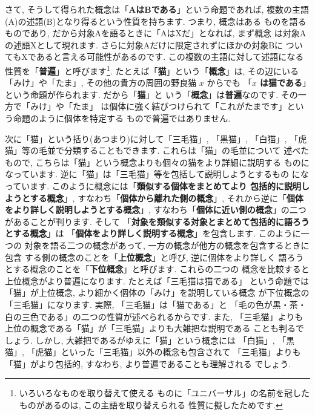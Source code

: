 さて, そうして得られた概念は「\textbf{AはBである}」という命題であれば,
 複数の主語(A)の述語(B)となり得るという性質を持ちます. つまり, 概念はある
ものを語るものであり, だから対象Aを語るときに「AはXだ」となれば, まず概念
は対象Aの述語Xとして現れます. さらに対象Aだけに限定されずにほかの対象Bに
ついてもXであると言える可能性があるのです. この複数の主語に対して述語になる
性質を「\textbf{普遍}」と呼びます\footnote{いろいろなものを取り替えて使える
ものに「ユニバーサル」の名前を冠したものがあるのは, この主語を取り替えられる
性質に擬したためです.}. たとえば「\textbf{猫}」という「\textbf{概念}」は,
 その辺にいる「みけ」や「たま」, その他の貴方の周囲の野良猫 $x$ からでも
「\textbf{$x$ は猫である}」という命題が作られます. だから「\textbf{猫}」と
いう「\textbf{概念}」は\textbf{普遍}なのです. その一方で「みけ」や「たま」
は個体に強く結びつけられて「これがたまです」という命題のように個体を特定する
もので普遍ではありません. 
\newline

次に「猫」という括り(あつまり)に対して「三毛猫」, 「黒猫」, 「白猫」,
 「虎猫」等の毛並で分類することもできます. これらは「猫」の毛並について
述べたもので, こちらは「猫」という概念よりも個々の猫をより詳細に説明する
ものになっています. 逆に「猫」は「三毛猫」等を包括して説明しようとするもの
になっています. このように概念には「\textbf{類似する個体をまとめてより
包括的に説明しようとする概念}」, すなわち「\textbf{個体から離れた側の概念}」,
 それから逆に「\textbf{個体をより詳しく説明しようとする概念}」, 
 すなわち「\textbf{個体に近い側の概念}」の二つがあることが判ります. そして
「\textbf{対象を類似する対象とまとめて包括的に語ろうとする概念}」は
「\textbf{個体をより詳しく説明する概念}」を包含します. このように一つの
対象を語る二つの概念があって, 一方の概念が他方の概念を包含するときに包含
する側の概念のことを「\textbf{上位概念}」と呼び, 逆に個体をより詳しく
語ろうとする概念のことを「\textbf{下位概念}」と呼びます. これらの二つの
概念を比較すると上位概念がより普遍になります. たとえば「三毛猫は猫である」
という命題では「猫」が上位概念, より細かく個体の「みけ」を説明している概念
が下位概念の「三毛猫」になります. 実際, 「三毛猫」は「猫である」と
「毛の色が黒・茶・白の三色である」の二つの性質が述べられるからです. また,
 「三毛猫」よりも上位の概念である「猫」が「三毛猫」よりも大雑把な説明である
ことも判るでしょう. しかし, 大雑把であるがゆえに「猫」という概念には
「白猫」, 「黒猫」, 「虎猫」といった「三毛猫」以外の概念も包含されて
「三毛猫」よりも「猫」がより包括的, すなわち, より普遍であることも理解される
でしょう. 
\newline

